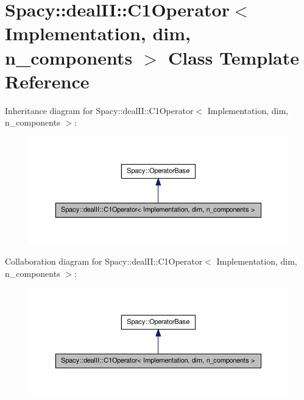 \hypertarget{classSpacy_1_1dealII_1_1C1Operator}{\section{\-Spacy\-:\-:deal\-I\-I\-:\-:\-C1\-Operator$<$ \-Implementation, dim, n\-\_\-components $>$ \-Class \-Template \-Reference}
\label{classSpacy_1_1dealII_1_1C1Operator}
}


\-Inheritance diagram for \-Spacy\-:\-:deal\-I\-I\-:\-:\-C1\-Operator$<$ \-Implementation, dim, n\-\_\-components $>$\-:
\nopagebreak
\begin{figure}[H]
\begin{center}
\leavevmode
\includegraphics[width=350pt]{classSpacy_1_1dealII_1_1C1Operator__inherit__graph}
\end{center}
\end{figure}


\-Collaboration diagram for \-Spacy\-:\-:deal\-I\-I\-:\-:\-C1\-Operator$<$ \-Implementation, dim, n\-\_\-components $>$\-:
\nopagebreak
\begin{figure}[H]
\begin{center}
\leavevmode
\includegraphics[width=350pt]{classSpacy_1_1dealII_1_1C1Operator__coll__graph}
\end{center}
\end{figure}
